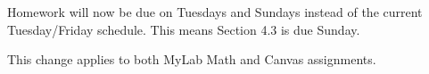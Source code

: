 \documentclass[]{article}
\begin{document}
Homework will now be due on Tuesdays and Sundays instead of the current Tuesday/Friday schedule. This means Section 4.3 is due Sunday.

This change applies to both MyLab Math and Canvas assignments.
\end{document}

